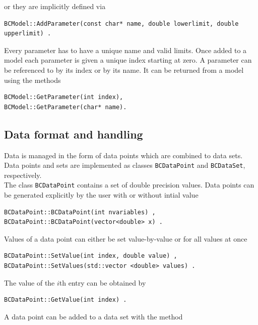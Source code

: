 \documentclass[11pt, a4paper]{article}
\begin{document}
\noindent 
or they are implicitly defined via 
%
\begin{verbatim}
BCModel::AddParameter(const char* name, double lowerlimit, double upperlimit) . 
\end{verbatim}

\noindent 
Every parameter has to have a unique name and valid limits. Once added
to a model each parameter is given a unique index starting at zero. A
parameter can be referenced to by its index or by its name. It can be
returned from a model using the methods
% 
\begin{verbatim} 
BCModel::GetParameter(int index), 
BCModel::GetParameter(char* name). 
\end{verbatim}  


\subsection{Data format and handling} 
\label{subsection:data} 

Data is managed in the form of data points which are combined to data
sets. Data points and sets are implemented as classes
\verb|BCDataPoint| and \verb|BCDataSet|, respectively. \\ 

\noindent 
The class \verb|BCDataPoint| contains a set of double precision
values. Data points can be generated explicitly by the user with or
without intial value
%
\begin{verbatim} 
BCDataPoint::BCDataPoint(int nvariables) ,
BCDataPoint::BCDataPoint(vector<double> x) .  
\end{verbatim} 

\noindent 
Values of a data point can either be set value-by-value or for all
values at once
%
\begin{verbatim} 
BCDataPoint::SetValue(int index, double value) , 
BCDataPoint::SetValues(std::vector <double> values) . 
\end{verbatim} 

\noindent 
The value of the $i$th entry can be obtained by 
%
\begin{verbatim}
BCDataPoint::GetValue(int index) . 
\end{verbatim} 

\noindent 
A data point can be added to a data set with the method
\end{document}

